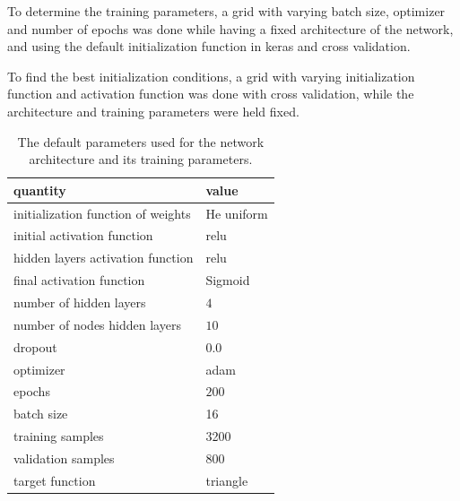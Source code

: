 \documentclass[prl,twocolumn]{revtex4-1}
\begin{document}
To determine the training parameters, a grid with varying batch size, optimizer and number of epochs was done while having a fixed architecture of the network, and using the default initialization function in keras and cross validation.

To find the best initialization conditions, a grid with varying initialization function and activation function was done with cross validation, while the architecture and training parameters were held fixed.




\begin{table}[!b]
\begin{center}
\begin{tabular}{ll}
quantity & value \\
\hline
initialization function of weights & He uniform\\ 
initial activation function & relu \\
hidden layers activation function & relu\\
final activation function & Sigmoid \\
number of hidden layers & $4$ \\
number of nodes hidden layers & $10$\\
dropout & $0.0$\\
optimizer & adam\\
epochs & $200$ \\
batch size & 16\\
training samples & 3200\\
validation samples & 800\\
target function & triangle
\end{tabular}
\end{center}
\caption{The default parameters used for the network architecture and its training parameters.}
\label{tab:optimal_value}
\end{table}
\end{document}
